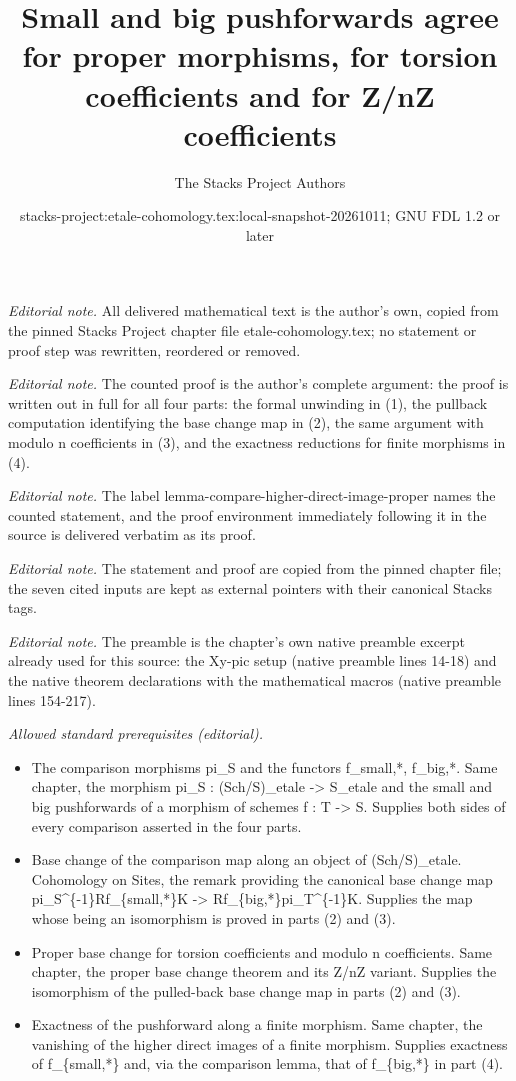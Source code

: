 \documentclass[10pt,a4paper]{amsart}
\title{Small and big pushforwards agree for proper morphisms, for torsion coefficients and for Z/nZ coefficients}
\author{The Stacks Project Authors}
\date{stacks-project:etale-cohomology.tex:local-snapshot-20261011; GNU FDL 1.2 or later}
\theoremstyle{plain}
\theoremstyle{definition}
\theoremstyle{remark}
\numberwithin{equation}{subsection}
\begin{document}
\maketitle
\noindent\textit{Editorial note.} All delivered mathematical text is the author's own, copied from the pinned Stacks Project chapter file etale-cohomology.tex; no statement or proof step was rewritten, reordered or removed.\par\medskip
\noindent\textit{Editorial note.} The counted proof is the author's complete argument: the proof is written out in full for all four parts: the formal unwinding in (1), the pullback computation identifying the base change map in (2), the same argument with modulo n coefficients in (3), and the exactness reductions for finite morphisms in (4).\par\medskip
\noindent\textit{Editorial note.} The label lemma-compare-higher-direct-image-proper names the counted statement, and the proof environment immediately following it in the source is delivered verbatim as its proof.\par\medskip
\noindent\textit{Editorial note.} The statement and proof are copied from the pinned chapter file; the seven cited inputs are kept as external pointers with their canonical Stacks tags.\par\medskip
\noindent\textit{Editorial note.} The preamble is the chapter's own native preamble excerpt already used for this source: the Xy-pic setup (native preamble lines 14-18) and the native theorem declarations with the mathematical macros (native preamble lines 154-217).\par\medskip
\noindent\textit{Allowed standard prerequisites (editorial).}\begin{itemize}
\item The comparison morphisms pi\_S and the functors f\_small,*, f\_big,*. Same chapter, the morphism pi\_S : (Sch/S)\_etale -> S\_etale and the small and big pushforwards of a morphism of schemes f : T -> S. Supplies both sides of every comparison asserted in the four parts.
\item Base change of the comparison map along an object of (Sch/S)\_etale. Cohomology on Sites, the remark providing the canonical base change map pi\_S\textasciicircum{}\{-1\}Rf\_\{small,*\}K -> Rf\_\{big,*\}pi\_T\textasciicircum{}\{-1\}K. Supplies the map whose being an isomorphism is proved in parts (2) and (3).
\item Proper base change for torsion coefficients and modulo n coefficients. Same chapter, the proper base change theorem and its Z/nZ variant. Supplies the isomorphism of the pulled-back base change map in parts (2) and (3).
\item Exactness of the pushforward along a finite morphism. Same chapter, the vanishing of the higher direct images of a finite morphism. Supplies exactness of f\_\{small,*\} and, via the comparison lemma, that of f\_\{big,*\} in part (4).
\end{itemize}\medskip
\end{document}

